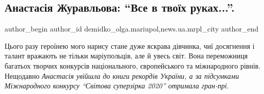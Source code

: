 
 
 
 
 
 
\subsection{Анастасія Журавльова: \enquote{Все в твоїх руках...}.}
\label{sec:26_01_2021.stz.news.ua.mrpl_city.1.anastasia_zhuravljova_vse_v_tvoih_rukah}
 
\ifcmt
 author_begin
   author_id demidko_olga.mariupol,news.ua.mrpl_city
 author_end
\fi


Цього разу героїнею мого нарису стане дуже яскрава дівчинка, чиї досягнення і
талант вражають не тільки маріупольців, але й увесь світ. Вона переможниця
багатьох творчих конкурсів національного, європейського та міжнародного рівнів.
Нещодавно \emph{Анастасія увійшла до книги рекордів України, а за підсумками
Міжнародного конкурсу \enquote{Світова суперзірка 2020} отримала гран-прі.}

